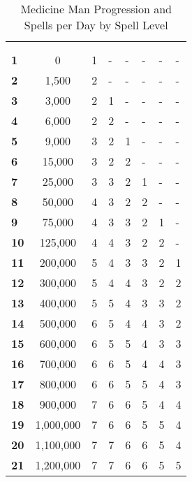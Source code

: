 \begin{multicols*}{2}

\begin {table}[H]
  \caption{Medicine Man Progression and Spells per Day by Spell Level}
  \begin{tabularx}{\columnwidth}{>{\bfseries}YcYYYYYY}
		\thead{} & \thead{} & \\
		 &  &  &  &  &  &  & \\
		1 & 0 & 1 & - & - & - & - & -\\
		2 & 1,500 & 2 & - & - & - & - & -\\
		3 & 3,000 & 2 & 1 & - & - & - & -\\
		4 & 6,000 & 2 & 2 & - & - & - & -\\
		5 & 9,000 & 3 & 2 & 1 & - & - & -\\
		6 & 15,000 & 3 & 2 & 2 & - & - & -\\
		7 & 25,000 & 3 & 3 & 2 & 1 & - & -\\
		8 & 50,000 & 4 & 3 & 2 & 2 & - & -\\
		9 & 75,000 & 4 & 3 & 3 & 2 & 1 & -\\
		10 & 125,000 & 4 & 4 & 3 & 2 & 2 & -\\
		11 & 200,000 & 5 & 4 & 3 & 3 & 2 & 1\\
		12 & 300,000 & 5 & 4 & 4 & 3 & 2 & 2\\
		13 & 400,000 & 5 & 5 & 4 & 3 & 3 & 2\\
		14 & 500,000 & 6 & 5 & 4 & 4 & 3 & 2\\
		15 & 600,000 & 6 & 5 & 5 & 4 & 3 & 3\\
		16 & 700,000 & 6 & 6 & 5 & 4 & 4 & 3\\
		17 & 800,000 & 6 & 6 & 5 & 5 & 4 & 3\\
		18 & 900,000 & 7 & 6 & 6 & 5 & 4 & 4\\
		19 & 1,000,000 & 7 & 6 & 6 & 5 & 5 & 4\\
		20 & 1,100,000 & 7 & 7 & 6 & 6 & 5 & 4\\
		21 & 1,200,000 & 7 & 7 & 6 & 6 & 5 & 5\\

\end{tabularx}
\end{table}
\end{multicols*}
